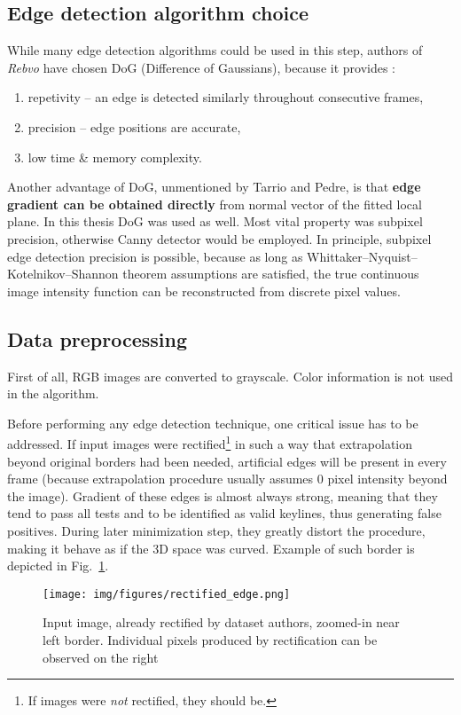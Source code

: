 \subsection{Edge detection algorithm choice}
While many edge detection algorithms could be used in this step, authors of \textit{Rebvo} have chosen DoG (Difference of Gaussians), because it provides \cite{jose2015realtime}:
\begin{enumerate}
	\item repetivity -- an edge is detected similarly throughout consecutive frames,
	\item precision -- edge positions are accurate,
	\item low time \& memory complexity.
\end{enumerate}

Another advantage of DoG, unmentioned by Tarrio and Pedre, is that \textbf{edge gradient can be obtained directly} from normal vector of the fitted local plane. In this thesis DoG was used as well. Most vital property was subpixel precision, otherwise Canny detector \cite{canny} would be employed. In principle, subpixel edge detection precision is possible, because as long as Whittaker–Nyquist–Kotelnikov–Shannon theorem assumptions are satisfied, the true continuous image intensity function can be reconstructed from discrete pixel values.

\subsection{Data preprocessing}

First of all, RGB images are converted to grayscale. Color information is not used in the algorithm.

Before performing any edge detection technique, one critical issue has to be addressed. If input images were rectified\footnote{If images were \textit{not} rectified, they should be.} in such a way that extrapolation beyond original borders had been needed, artificial edges will be present in every frame (because extrapolation procedure usually assumes 0 pixel intensity beyond the image). Gradient of these edges is almost always strong, meaning that they tend to pass all tests and to be identified as valid keylines, thus generating false positives. During later minimization step, they greatly distort the procedure, making it behave as if the 3D space was curved. Example of such border is depicted in Fig.~\ref{fig:rectifcy_border}.

\begin{figure}[ht]
	\centering\texttt{[image: img/figures/rectified\_edge.png]}
	\caption{ Input image, already rectified by dataset authors, zoomed-in near left border. Individual pixels produced by rectification can be observed on the right }
	\label{fig:rectifcy_border}
\end{figure}

